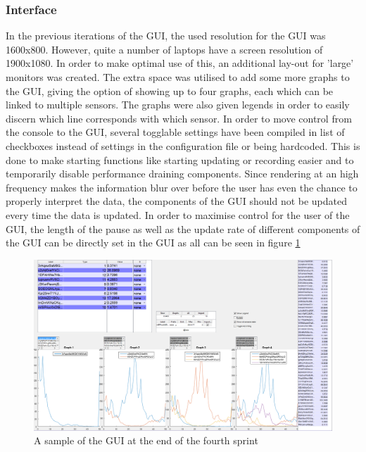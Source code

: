 \subsubsection{Interface}
In the previous iterations of the GUI, the used resolution for the GUI was 1600x800. However, quite a number of laptops have a screen resolution of 1900x1080. In order to make optimal use of this, an additional lay-out for 'large' monitors was created. The extra space was utilised to add some more graphs to the GUI, giving the option of showing up to four graphs, each which can be linked to multiple sensors. The graphs were also given legends in order to easily discern which line corresponds with which sensor. 
In order to move control from the console to the GUI, several togglable settings have been compiled in list of checkboxes instead of settings in the configuration file or being hardcoded. This is done to make starting functions like starting updating or recording easier and to temporarily disable performance draining components.
Since rendering at an high frequency makes the information blur over before the user has even the chance to properly interpret the data, the components of the GUI should not be updated every time the data is updated. In order to maximise control for the user of the GUI, the length of the pause as well as the update rate of different components of the GUI can be directly set in the GUI as all can be seen in figure \ref{fig:GUIV3}



\begin{figure}[H]
	\centering
	\includegraphics[width=.75\textwidth]{images/GUIV3}
	\caption{A sample of the GUI at the end of the fourth sprint} 
	\label{fig:GUIV3}
\end{figure} 


